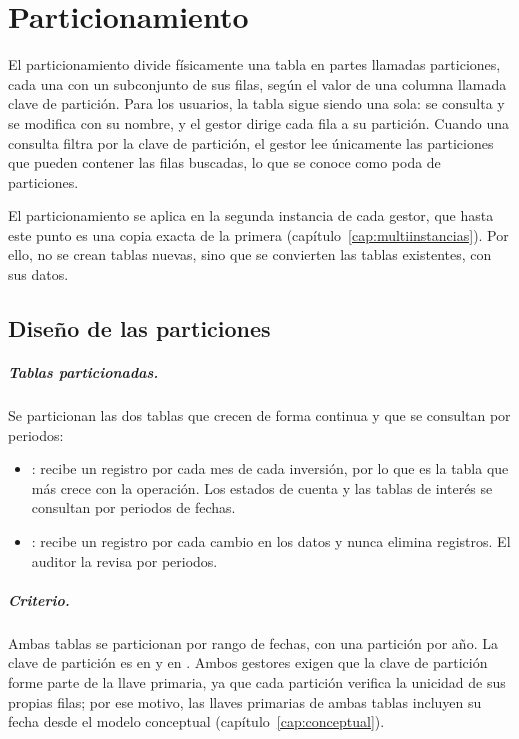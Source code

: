 \chapter{Particionamiento}
\label{cap:particionamiento}

El particionamiento divide físicamente una tabla en partes llamadas particiones, cada una con un subconjunto de sus filas, según el valor de una columna llamada clave de partición. Para los usuarios, la tabla sigue siendo una sola: se consulta y se modifica con su nombre, y el gestor dirige cada fila a su partición. Cuando una consulta filtra por la clave de partición, el gestor lee únicamente las particiones que pueden contener las filas buscadas, lo que se conoce como poda de particiones.

El particionamiento se aplica en la segunda instancia de cada gestor, que hasta este punto es una copia exacta de la primera (capítulo~\ref{cap:multiinstancias}). Por ello, no se crean tablas nuevas, sino que se convierten las tablas existentes, con sus datos.

\section{Dise\~no de las particiones}

\paragraph{Tablas particionadas.} Se particionan las dos tablas que crecen de forma continua y que se consultan por periodos:

\begin{itemize}[leftmargin=*]
	\item {}: recibe un registro por cada mes de cada inversión, por lo que es la tabla que más crece con la operación. Los estados de cuenta y las tablas de interés se consultan por periodos de fechas.
	\item {}: recibe un registro por cada cambio en los datos y nunca elimina registros. El auditor la revisa por periodos.
\end{itemize}

\paragraph{Criterio.} Ambas tablas se particionan por rango de fechas, con una partición por año. La clave de partición es  en  y  en . Ambos gestores exigen que la clave de partición forme parte de la llave primaria, ya que cada partición verifica la unicidad de sus propias filas; por ese motivo, las llaves primarias de ambas tablas incluyen su fecha desde el modelo conceptual (capítulo~\ref{cap:conceptual}).

